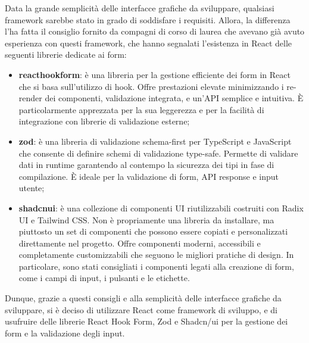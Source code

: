 Data la grande semplicità delle interfacce grafiche da sviluppare, qualsiasi framework sarebbe stato in grado di soddisfare i requisiti. Allora, la differenza l'ha fatta il consiglio fornito da compagni di corso di laurea che avevano già avuto esperienza con questi framework, che hanno segnalati l'esistenza in React delle seguenti librerie dedicate ai form:
\begin{itemize}
    \item \textbf{\gls{reacthookform}}: è una libreria per la gestione efficiente dei form in React che si basa sull'utilizzo di \gls{hook}. Offre prestazioni elevate minimizzando i re-render dei componenti, validazione integrata, e un'API semplice e intuitiva. È particolarmente apprezzata per la sua leggerezza e per la facilità di integrazione con librerie di validazione esterne;
    \item \textbf{\gls{zod}}: è una libreria di validazione schema-first per TypeScript e JavaScript che consente di definire schemi di validazione type-safe. Permette di validare dati in runtime garantendo al contempo la sicurezza dei tipi in fase di compilazione. È ideale per la validazione di form, API response e input utente;
    \item \textbf{\gls{shadcnui}}: è una collezione di componenti UI riutilizzabili costruiti con Radix UI e Tailwind CSS. Non è propriamente una libreria da installare, ma piuttosto un set di componenti che possono essere copiati e personalizzati direttamente nel progetto. Offre componenti moderni, accessibili e completamente customizzabili che seguono le migliori pratiche di design. In particolare, sono stati consigliati i componenti legati alla creazione di form, come i campi di input, i pulsanti e le etichette.
\end{itemize}

Dunque, grazie a questi consigli e alla semplicità delle interfacce grafiche da sviluppare, si è deciso di utilizzare React come framework di sviluppo, e di usufruire delle librerie React Hook Form, Zod e Shadcn/ui per la gestione dei form e la validazione degli input.

